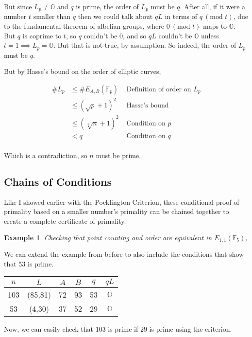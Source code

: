 \documentclass[]{article}
\newtheorem{benexample}{Example}
\newcommand{\OS}{\mathbb{O}}
\newcommand{\F}{\mathbb{F}}
\newcommand{\Mod}[1]{\ (\text{mod }#1)}
\begin{document}
\noindent  But since $L_p \ne \OS$ and $q$ is prime, the order of $L_p$ must be $q$. After all, if it were a number $t$ smaller than $q$ then we could talk about $qL$ in terms of $q \Mod{t}$, due to the fundamental theorem of albelian groups, where $0 \Mod{t}$ maps to $\OS$. But $q$ is coprime to $t$, so $q$ couldn't be 0, and so $qL$ couldn't be $\OS$ unless $t=1 \implies L_p = \OS$. But that is not true, by assumption. So indeed, the order of $L_p$ must be $q$. %

\noindent But by Hasse's bound on the order of elliptic curves,

$$\begin{aligned}\# L_p &\le \# E_{A,B}(\F_p) & \text{ Definition of order on } L_p\\
 &\le (\sqrt{p}+1)^2  & \text{  Hasse's bound}\\
 &\le (\sqrt[4]{n}+1)^2 & \text{ Condition on } p\\
 &< q & \text{ Condition on } q\\
 \end{aligned}$$

\noindent  Which is a contradiction, so $n$ must be prime.

\subsection{Chains of Conditions}

Like I showed earlier with the Pocklington Criterion, these conditional proof of primality based on a smaller number's primality can be chained together to create a complete certificate of primality.

\begin{tcolorbox}[breakable,
	enhanced,
	standard jigsaw,
	opacityback=0]
	
	\noindent \begin{benexample}
		Checking that point counting and order are equivalent in $E_{1,1}(\F_5)$,
	\end{benexample}
	
	We can extend the example from before to also include the conditions that show that 53 is prime.
	
	\begin{tabular}{ c | c | c | c | c | c }
		$n$ & $L$     & $A$ & $B$ & $q$ & $qL$ \\ \hline
		103 & (85,81) & 72 &  93 &  53 &  $\OS$ \\ \hline
		53 & (4,30)   & 37 & 52 & 29  & $\OS$ \\ \hline
	\end{tabular}
	
	\noindent Now, we can easily check that 103 is prime if 29 is prime using the criterion.
	
\end{tcolorbox}
\end{document}
